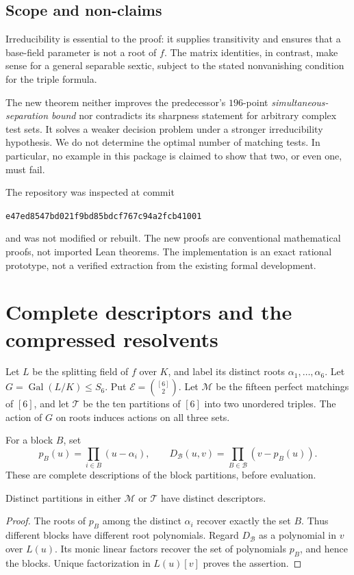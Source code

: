 \documentclass[11pt,letterpaper]{article}
\numberwithin{equation}{section}
\theoremstyle{definition}
\theoremstyle{remark}
\DeclareMathOperator{\Gal}{Gal}
\newcommand{\Edges}{\mathcal E}
\newcommand{\tpoM}{\mathcal M}
\newcommand{\tpoT}{\mathcal T}
\newcommand{\tpopin}{\texttt{e47ed8547bd021f9bd85bdcf767c94a2fcb41001}}
\begin{document}
\subsection{Scope and non-claims}
Irreducibility is essential to the proof: it supplies transitivity and ensures
that a base-field parameter is not a root of $f$. The matrix identities, in
contrast, make sense for a general separable sextic, subject to the stated
nonvanishing condition for the triple formula.

The new theorem neither improves the predecessor's $196$-point
\emph{simultaneous-separation bound} nor contradicts its sharpness statement
for arbitrary complex test sets. It solves a weaker decision problem under a
stronger irreducibility hypothesis. We do not determine the optimal number of
matching tests. In particular, no example in this package is claimed to show
that two, or even one, must fail.

The repository was inspected at commit
\begin{center}\small\tpopin\end{center}
and was not modified or rebuilt. The new proofs are conventional mathematical
proofs, not imported Lean theorems. The implementation is an exact rational
prototype, not a verified extraction from the existing formal development.

\section{Complete descriptors and the compressed resolvents}
\label{tpo:sec:descriptors}

Let $L$ be the splitting field of $f$ over $K$, and label its distinct roots
$\alpha_1,\ldots,\alpha_6$. Let $G=\Gal(L/K)\le S_6$. Put
$\Edges=\binom{[6]}2$. Let $\tpoM$ be the fifteen perfect matchings of $[6]$, and let
$\tpoT$ be the ten partitions of $[6]$ into two unordered triples. The action of
$G$ on roots induces actions on all three sets.

For a block $B$, set
\[
 p_B(u)=\prod_{i\in B}(u-\alpha_i),\qquad
 D_{\mathcal B}(u,v)=\prod_{B\in\mathcal B}(v-p_B(u)).
\]
These are complete descriptions of the block partitions, before evaluation.

\begin{lemma}[Completeness]
\label{tpo:lem:complete}
Distinct partitions in either $\tpoM$ or $\tpoT$ have distinct descriptors.
\end{lemma}
\begin{proof}
The roots of $p_B$ among the distinct $\alpha_i$ recover exactly the set $B$.
Thus different blocks have different root polynomials. Regard $D_{\mathcal B}$
as a polynomial in $v$ over $L(u)$. Its monic linear factors recover the set
of polynomials $p_B$, and hence the blocks. Unique factorization in $L(u)[v]$
proves the assertion.
\end{proof}
\end{document}
